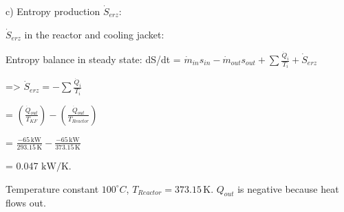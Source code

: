 c) Entropy production \( \dot{S}_{erz} \):  

\( \dot{S}_{erz} \) in the reactor and cooling jacket:  

Entropy balance in steady state:  
dS/dt = \( \dot{m}_{in} s_{in} - \dot{m}_{out} s_{out} + \sum \frac{\dot{Q}_i}{T_i} + \dot{S}_{erz} \)  

=> \( \dot{S}_{erz} = -\sum \frac{\dot{Q}_i}{T_i} \)  

= \( \left( \frac{\dot{Q}_{out}}{T_{KF}} \right) - \left( \frac{\dot{Q}_{out}}{T_{Reactor}} \right) \)  

= \( \frac{-65 \, \text{kW}}{293.15 \, \text{K}} - \frac{-65 \, \text{kW}}{373.15 \, \text{K}} \)  

= 0.047 \( \text{kW/K} \).  

Temperature constant \( 100^\circ C \), \( T_{Reactor} = 373.15 \, \text{K} \).  
\( Q_{out} \) is negative because heat flows out.